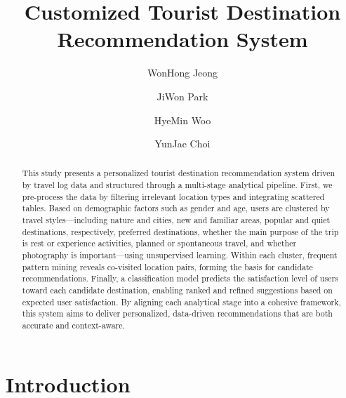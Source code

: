 \documentclass[sigconf]{acmart}
\begin{document}
\title{Customized Tourist Destination Recommendation System}

\author{WonHong Jeong}

\author{JiWon Park}

\author{HyeMin Woo}

\author{YunJae Choi}




\begin{abstract}
This study presents a personalized tourist destination recommendation system driven by travel log data and structured through a multi-stage analytical pipeline. First, we pre-process the data by filtering irrelevant location types and integrating scattered tables. Based on demographic factors such as gender and age, users are clustered by travel styles—including nature and cities, new and familiar areas, popular and quiet destinations, respectively, preferred destinations, whether the main purpose of the trip is rest or experience activities, planned or spontaneous travel, and whether photography is important—using unsupervised learning. Within each cluster, frequent pattern mining reveals co-visited location pairs, forming the basis for candidate recommendations. Finally, a classification model predicts the satisfaction level of users toward each candidate destination, enabling ranked and refined suggestions based on expected user satisfaction. By aligning each analytical stage into a cohesive framework, this system aims to deliver personalized, data-driven recommendations that are both accurate and context-aware.
\end{abstract}


\maketitle

\section{Introduction}
\end{document}
